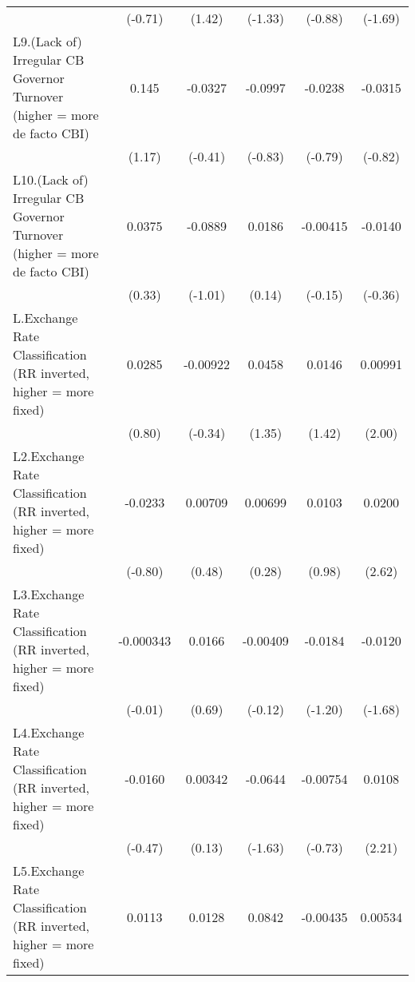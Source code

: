 {\begin{longtable}{l*{5}{c}}
                &  (-0.71)         &   (1.42)         &  (-1.33)         &  (-0.88)         &  (-1.69)         \\
\addlinespace
L9.(Lack of) Irregular CB Governor Turnover (higher = more de facto CBI)&    0.145         &  -0.0327         &  -0.0997         &  -0.0238         &  -0.0315         \\
                &   (1.17)         &  (-0.41)         &  (-0.83)         &  (-0.79)         &  (-0.82)         \\
\addlinespace
L10.(Lack of) Irregular CB Governor Turnover (higher = more de facto CBI)&   0.0375         &  -0.0889         &   0.0186         & -0.00415         &  -0.0140         \\
                &   (0.33)         &  (-1.01)         &   (0.14)         &  (-0.15)         &  (-0.36)         \\
\addlinespace
L.Exchange Rate Classification (RR inverted, higher = more fixed)&   0.0285         & -0.00922         &   0.0458         &   0.0146         &  0.00991\sym{*}  \\
                &   (0.80)         &  (-0.34)         &   (1.35)         &   (1.42)         &   (2.00)         \\
\addlinespace
L2.Exchange Rate Classification (RR inverted, higher = more fixed)&  -0.0233         &  0.00709         &  0.00699         &   0.0103         &   0.0200\sym{**} \\
                &  (-0.80)         &   (0.48)         &   (0.28)         &   (0.98)         &   (2.62)         \\
\addlinespace
L3.Exchange Rate Classification (RR inverted, higher = more fixed)&-0.000343         &   0.0166         & -0.00409         &  -0.0184         &  -0.0120         \\
                &  (-0.01)         &   (0.69)         &  (-0.12)         &  (-1.20)         &  (-1.68)         \\
\addlinespace
L4.Exchange Rate Classification (RR inverted, higher = more fixed)&  -0.0160         &  0.00342         &  -0.0644         & -0.00754         &   0.0108\sym{*}  \\
                &  (-0.47)         &   (0.13)         &  (-1.63)         &  (-0.73)         &   (2.21)         \\
\addlinespace
L5.Exchange Rate Classification (RR inverted, higher = more fixed)&   0.0113         &   0.0128         &   0.0842\sym{*}  & -0.00435         &  0.00534         \\

\end{longtable}}
